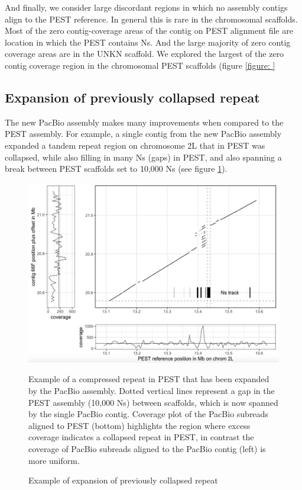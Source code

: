 \par{
And finally, we consider large discordant regions in which no assembly contigs align to the PEST reference. In general this is rare in the chromosomal scaffolds. Most of the zero contig-coverage areas of the contig on PEST alignment file are location in which the PEST contains Ns. And the large majority of zero contig coverage areas are in the UNKN scaffold. We explored the largest of the zero contig coverage region in the chromosomal PEST scaffolds (figure \ref{figure:
}


\subsection{Expansion of previously collapsed repeat}

\par{
The new PacBio assembly makes many improvements when compared to the PEST assembly. For example, a single contig from the new PacBio assembly expanded a tandem repeat region on chromosome 2L that in PEST was collapsed, while also filling in many Ns (gaps) in PEST, and also spanning a break between PEST scaffolds set to 10,000 Ns (see figure \ref{figure:repeat}).
}

\begin{figure}[htbp!]

\caption{Example of expansion of previously collapsed repeat}
\label{figure:repeat}
\begin{centering}
\includegraphics[width=1.0\textwidth]{repeatexpansion.png}
\par{ Example of a compressed repeat in PEST that has been expanded by the PacBio assembly. Dotted vertical lines represent a gap in the PEST assembly (10,000 Ns) between scaffolds, which is now spanned by the single PacBio contig. Coverage plot of the PacBio subreads aligned to PEST (bottom) highlights the region where excess coverage indicates a collapsed repeat in PEST, in contrast the coverage of PacBio subreads aligned to the PacBio contig (left) is more uniform. }
\end{centering}
\end{figure}

}
